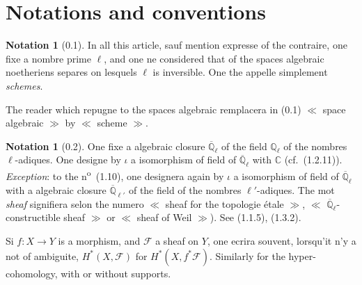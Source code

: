 \documentclass[12pt,a4paper]{article}
\theoremstyle{plain}
\theoremstyle{definition}
\newtheorem{notation}[theorem]{Notation}
\theoremstyle{definition}
\theoremstyle{remark}
\begin{document}
\newpage

\section*{Notations and conventions}

\begin{notation}[0.1]
In all this article, sauf mention expresse of the contraire, one fixe a nombre prime $\ell$, and one ne considered that of the spaces algebraic noetheriens separes on lesquels $\ell$ is inversible. One the appelle simplement \emph{schemes}.

The reader which repugne to the spaces algebraic remplacera in (0.1) $\ll$ space algebraic $\gg$ by $\ll$ scheme $\gg$.
\end{notation}

\begin{notation}[0.2]
One fixe a algebraic closure $\overline{\mathbb{Q}}_\ell$ of the field $\mathbb{Q}_\ell$ of the nombres $\ell$-adiques. One designe by $\iota$ a isomorphism of field of $\overline{\mathbb{Q}}_\ell$ with $\mathbb{C}$ (cf.~(1.2.11)). \emph{Exception}: to the n\textsuperscript{o}~(1.10), one designera again by $\iota$ a isomorphism of field of $\overline{\mathbb{Q}}_\ell$ with a algebraic closure $\overline{\mathbb{Q}}_{\ell'}$ of the field of the nombres $\ell'$-adiques. The mot \emph{sheaf} signifiera selon the numero $\ll$ sheaf for the topologie étale $\gg$, $\ll$ $\overline{\mathbb{Q}}_\ell$-constructible sheaf $\gg$ or $\ll$ sheaf of Weil $\gg$). See (1.1.5), (1.3.2).

Si $f: X \to Y$ is a morphism, and $\mathscr{F}$ a sheaf on $Y$, one ecrira souvent, lorsqu'it n'y a not of ambiguite, $H^*(X, \mathscr{F})$ for $H^*(X, f^*\mathscr{F})$. Similarly for the hyper-cohomology, with or without supports.
\end{notation}
\end{document}
